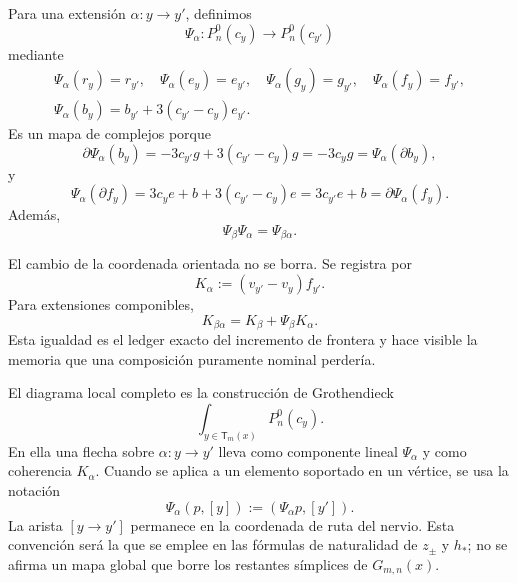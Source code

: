 Para una extensión \(\alpha:y\to y'\), definimos
\begin{equation}\label{eq:detint-psi}
 \Psi_\alpha:P_n^0(c_y)\longrightarrow P_n^0(c_{y'})
\end{equation}
mediante
\begin{equation}\label{eq:detint-psi-generadores}
\begin{gathered}
 \Psi_\alpha(r_y)=r_{y'},\quad
 \Psi_\alpha(e_y)=e_{y'},\quad
 \Psi_\alpha(g_y)=g_{y'},\quad
 \Psi_\alpha(f_y)=f_{y'},\\
 \Psi_\alpha(b_y)=b_{y'}+3(c_{y'}-c_y)e_{y'}.
\end{gathered}
\end{equation}
Es un mapa de complejos porque
\begin{equation}\label{eq:detint-psi-b-chain}
 \partial\Psi_\alpha(b_y)
 =-3c_{y'}g+3(c_{y'}-c_y)g
 =-3c_yg
 =\Psi_\alpha(\partial b_y),
\end{equation}
y
\begin{equation}\label{eq:detint-psi-f-chain}
 \Psi_\alpha(\partial f_y)
 =3c_ye+b+3(c_{y'}-c_y)e
 =3c_{y'}e+b
 =\partial\Psi_\alpha(f_y).
\end{equation}
Además,
\begin{equation}\label{eq:detint-psi-functorial}
 \Psi_\beta\Psi_\alpha=\Psi_{\beta\alpha}.
\end{equation}

El cambio de la coordenada orientada no se borra. Se registra por
\begin{equation}\label{eq:detint-k-alpha}
 K_\alpha:=(v_{y'}-v_y)f_{y'}.
\end{equation}
Para extensiones componibles,
\begin{equation}\label{eq:detint-k-coherencia}
 K_{\beta\alpha}=K_\beta+\Psi_\beta K_\alpha.
\end{equation}
Esta igualdad es el ledger exacto del incremento de frontera y hace visible
la memoria que una composición puramente nominal perdería.

El diagrama local completo es la construcción de Grothendieck
\begin{equation}\label{eq:detint-grothendieck-local}
 \int_{y\in\mathsf T_m(x)}P_n^0(c_y).
\end{equation}
En ella una flecha sobre \(\alpha:y\to y'\) lleva como componente lineal
\(\Psi_\alpha\) y como coherencia \(K_\alpha\). Cuando se aplica a un
elemento soportado en un vértice, se usa la notación
\begin{equation}\label{eq:detint-psi-soporte-vertice}
 \Psi_\alpha(p,[y]):=(\Psi_\alpha p,[y']).
\end{equation}
La arista \([y\to y']\) permanece en la coordenada de ruta del nervio. Esta
convención será la que se emplee en las fórmulas de naturalidad de
\(z_\pm\) y \(h_*\); no se afirma un mapa global que borre los restantes
símplices de \(G_{m,n}(x)\).

